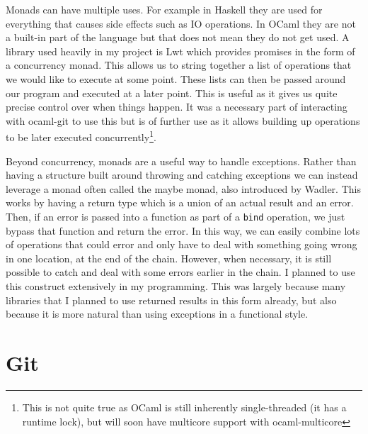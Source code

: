 Monads can have multiple uses. For example in Haskell they are used for everything that causes side effects such as IO operations. In OCaml they are not a built-in part of the language but that does not mean they do not get used. A library used heavily in my project is Lwt\cite{code_lwt} which provides promises\cite{Liskov1988} in the form of a concurrency monad. This allows us to string together a list of operations that we would like to execute at some point. These lists can then be passed around our program and executed at a later point. This is useful as it gives us quite precise control over when things happen. It was a necessary part of interacting with ocaml-git to use this but is of further use as it allows building up operations to be later executed concurrently\footnote{This is not quite true as OCaml is still inherently single-threaded (it has a runtime lock), but will soon have multicore support with ocaml-multicore\cite{dolan2014multicore}}.

Beyond concurrency, monads are a useful way to handle exceptions. Rather than having a structure built around throwing and catching exceptions we can instead leverage a monad often called the maybe monad, also introduced by Wadler\cite{wadler90monads}. This works by having a return type which is a union of an actual result and an error. Then, if an error is passed into a function as part of a \texttt{bind} operation, we just bypass that function and return the error. In this way, we can easily combine lots of operations that could error and only have to deal with something going wrong in one location, at the end of the chain. However, when necessary, it is still possible to catch and deal with some errors earlier in the chain. I planned to use this construct extensively in my programming. This was largely because many libraries that I planned to use returned results in this form already, but also because it is more natural than using exceptions in a functional style.

\section{Git}


